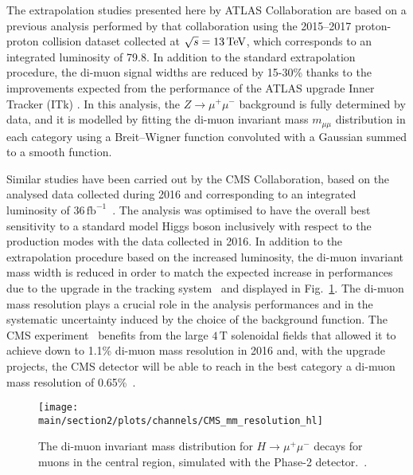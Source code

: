 The extrapolation studies presented here by ATLAS Collaboration are based on a previous analysis performed by that collaboration using the 2015--2017 proton-proton collision dataset collected at $\sqrt{s} = 13\,\text{TeV}$, which corresponds to an integrated luminosity of 79.8\fbinv \cite{Aaboud:2017ojs}. 
In addition to the standard extrapolation procedure, the di-muon signal widths are reduced  by 15-30\% thanks to the improvements expected from the performance of the ATLAS upgrade Inner Tracker (ITk) \cite{Collaboration:2285585}.
In this analysis, the $Z\to\mu^{+}\mu^{-}$ background is fully determined by data, and it is modelled by fitting the di-muon invariant mass $m_{\mu\mu}$ distribution in each category using a Breit--Wigner function convoluted with a Gaussian summed to a smooth function.

Similar studies have been carried out by the CMS Collaboration, based on the analysed data collected during 2016 and corresponding to an integrated luminosity of $36\,\text{fb}^{-1}$~\cite{HIG-17-019}. 
The analysis was optimised to have the overall best sensitivity to a standard model Higgs boson inclusively with respect to the production modes with the data collected in 2016.
In addition to the extrapolation procedure based on the increased luminosity, the di-muon invariant mass width is reduced in order to match the expected increase in performances due to the upgrade in the tracking system~\cite{Klein:2017nke} and displayed in Fig.~\ref{fig:cms_hmm_res_hl}. The di-muon mass resolution plays a crucial role in the analysis performances and in the systematic uncertainty induced by the choice of the background function. 
The CMS experiment~\cite{CMS} benefits from the large $4\,\text{T}$ solenoidal fields that allowed it to achieve down to 1.1\% di-muon mass resolution in 2016 and, with the upgrade projects, the CMS detector will be able to reach in the best category a di-muon mass resolution of 0.65\%~\cite{Klein:2017nke}.

\begin{figure}[h!]
\begin{center}
\texttt{[image: \\main/section2/plots/channels/CMS\_mm\_resolution\_hl]}
\end{center}
\caption{The di-muon invariant mass distribution for $H\rightarrow{}\mu^+\mu^-$ decays for muons in the
central region, simulated with the Phase-2 detector.~\protect\cite{Klein:2017nke}.}
\label{fig:cms_hmm_res_hl}
\end{figure}


